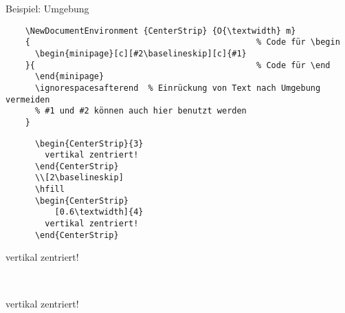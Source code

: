 \begin{frame}[fragile]{Beispiel: Umgebung}
  \begin{verbatim}
    \NewDocumentEnvironment {CenterStrip} {O{\textwidth} m}
    {                                              % Code für \begin
      \begin{minipage}[c][#2\baselineskip][c]{#1}
    }{                                             % Code für \end
      \end{minipage}
      \ignorespacesafterend  % Einrückung von Text nach Umgebung vermeiden
      % #1 und #2 können auch hier benutzt werden
    }
  \end{verbatim}

  \begin{CodeExample}{0.5}
    \begin{verbatim}
      \begin{CenterStrip}{3}
        vertikal zentriert!
      \end{CenterStrip}
      \\[2\baselineskip]
      \hfill
      \begin{CenterStrip}
          [0.6\textwidth]{4}
        vertikal zentriert!
      \end{CenterStrip}
    \end{verbatim}
  \CodeResult
    \begin{CenterStrip}{3}
      \strut
      vertikal zentriert!
    \end{CenterStrip}
    \\[2\baselineskip]
    \hfill
    \begin{CenterStrip}[0.6\textwidth]{4}
      \strut
      vertikal zentriert!
    \end{CenterStrip}
  \end{CodeExample}
\end{frame}

